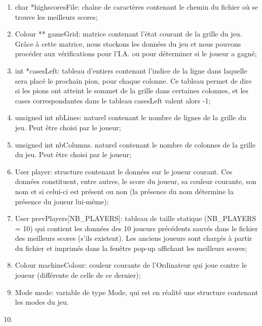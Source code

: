 \documentclass[a4paper, 11pt, oneside]{article}
\begin{document}
\begin{enumerate}
    \item char *highscoresFile: chaîne de caractères contenant le chemin du fichier où se trouve les meilleurs scores;
    \item Colour ** gameGrid: matrice contenant l'état courant de la grille du jeu. Grâce à cette matrice, nous stockons les données du jeu et nous pouvons procéder aux vérifications pour l'I.A. ou pour déterminer si le joueur a gagné;
    \item int *casesLeft: tableau d'entiers contenant l'indice de la ligne dans laquelle sera placé le prochain pion, pour chaque colonne. Ce tableau permet de dire si les pions ont atteint le sommet de la grille dans certaines colonnes, et les cases correspondantes dans le tableau casesLeft valent alors -1;
    \item  unsigned int nbLines: naturel contenant le nombre de lignes de la grille du jeu. Peut être choisi par le joueur;
    \item unsigned int nbColumns. naturel contenant le nombre de colonnes de la grille du jeu. Peut être choisi par le joueur;
    \item User player: structure contenant le données sur le joueur courant.
    Ces données constituent, entre autres, le score du joueur, sa couleur courante, son nom et si celui-ci est présent ou non (la présence du nom détermine la présence du joueur lui-même);
    \item User prevPlayers[NB\_PLAYERS]: tableau de taille statique (NB\_PLAYERS = 10) qui contient les données des 10 joueurs précédents sauvés dans le fichier des meilleurs scores (s'ils existent).
    Les anciens joueurs sont chargés à partir du fichier et imprimés dans la fenêtre pop-up affichant les meilleurs scores;
    \item Colour machineColour: couleur courante de l'Ordinateur qui joue contre le joueur (différente de celle de ce dernier);
    \item Mode mode: variable de type Mode, qui est en réalité une structure contenant les modes du jeu.
    \item []
\end{enumerate}
\end{document}
